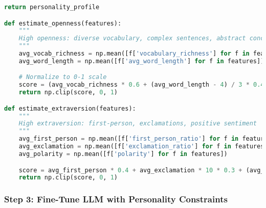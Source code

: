 \documentclass[10pt]{article}
\begin{document}
\begin{lstlisting}[language=Python]
    return personality_profile

def estimate_openness(features):
    """
    High openness: diverse vocabulary, complex sentences, abstract concepts
    """
    avg_vocab_richness = np.mean([f['vocabulary_richness'] for f in features])
    avg_word_length = np.mean([f['avg_word_length'] for f in features])

    # Normalize to 0-1 scale
    score = (avg_vocab_richness * 0.6 + (avg_word_length - 4) / 3 * 0.4)
    return np.clip(score, 0, 1)

def estimate_extraversion(features):
    """
    High extraversion: first-person, exclamations, positive sentiment
    """
    avg_first_person = np.mean([f['first_person_ratio'] for f in features])
    avg_exclamation = np.mean([f['exclamation_ratio'] for f in features])
    avg_polarity = np.mean([f['polarity'] for f in features])

    score = avg_first_person * 0.4 + avg_exclamation * 10 * 0.3 + (avg_polarity + 1) / 2 * 0.3
    return np.clip(score, 0, 1)
\end{lstlisting}

\subsubsection{Step 3: Fine-Tune LLM with Personality Constraints}
\end{document}
